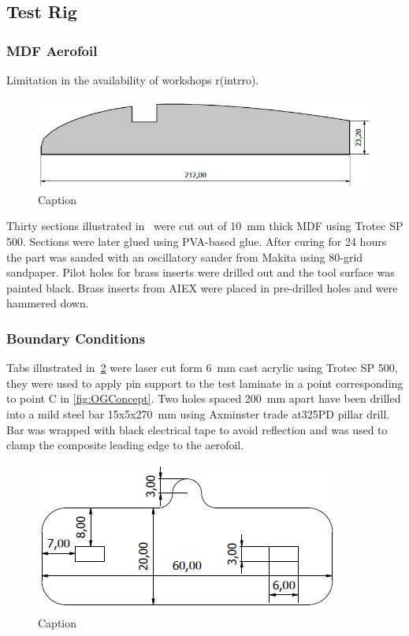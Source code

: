 \documentclass{IEEEtran}
\begin{document}
    \subsection{Test Rig}
    \subsubsection{MDF Aerofoil}
    Limitation in the availability of workshops r(intrro). 
    \begin{figure}[h]
        \centering
        \includegraphics[width = \linewidth]{Figures/Jan/laser2.png}
        \caption{Caption}
        \label{fig:laser}
    \end{figure}
    Thirty sections illustrated in~ were cut out of \SI{10}{\milli \meter} thick MDF using Trotec SP 500. Sections were later glued using PVA-based glue. After curing for 24 hours the part  was sanded with an oscillatory sander from Makita using 80-grid sandpaper. Pilot holes for brass inserts were drilled out and the tool surface was painted black. Brass inserts from AIEX were placed in pre-drilled holes and were hammered down.
    \subsubsection{Boundary Conditions}
    Tabs illustrated in~\cref{fig:nipple} were laser cut form \SI{6}{\milli \meter} cast acrylic using Trotec SP 500, they were used to apply pin support to the test laminate in a point corresponding to point C in \cref{fig:OGConcept}. Two holes spaced \SI{200}{\milli \meter} apart have been drilled into a mild steel bar 15x5x270\SI{}{\milli \meter} using Axminster trade at325PD pillar drill. Bar was wrapped with black electrical tape to avoid reflection and was used to clamp the composite leading edge to the aerofoil.
    \begin{figure}[h!]
        \centering
        \includegraphics[width = 0.6\linewidth]{Figures/Jan/nippleNumber.PNG}
        \caption{Caption}
        \label{fig:nipple}
    \end{figure}
\end{document}
